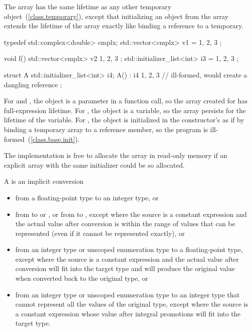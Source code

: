 \pnum
The array has the same lifetime as any other temporary
object~(\ref{class.temporary}), except that initializing an
 object from the array extends the lifetime of
the array exactly like binding a reference to a temporary.
\begin{example}

\begin{codeblock}
typedef std::complex<double> cmplx;
std::vector<cmplx> v1 = { 1, 2, 3 };

void f() {
  std::vector<cmplx> v2{ 1, 2, 3 };
  std::initializer_list<int> i3 = { 1, 2, 3 };
}

struct A {
  std::initializer_list<int> i4;
  A() : i4{ 1, 2, 3 } {}  // ill-formed, would create a dangling reference
};
\end{codeblock}

For  and , the  object
is a parameter in a function call, so the array created for
 has full-expression lifetime.
For , the  object is a variable,
so the array persists for the lifetime of the variable.
For , the  object is initialized in
the constructor's  as if by binding
a temporary array to a reference member, so the program is
ill-formed~(\ref{class.base.init}).
\end{example}
\begin{note}
The implementation is free to allocate the array in read-only memory if an explicit array with the same initializer could be so allocated. \end{note}

\pnum
A
%
%
 is an implicit conversion

\begin{itemize}
\item from a floating-point type to an integer type, or

\item from  to  or , or from
 to , except where the source is a constant expression and
the actual value after conversion
is within the range of values that can be represented (even if it cannot be represented exactly),
or

\item from an integer type or unscoped enumeration type to a floating-point type, except
where the source is a constant expression and the actual value after conversion will fit
into the target type and will produce the original value when converted back to the
original type, or

\item from an integer type or unscoped enumeration type to an integer type that cannot
represent all the values of the original type, except where the source is a constant
expression whose value after integral promotions will fit into the target type.
\end{itemize}

